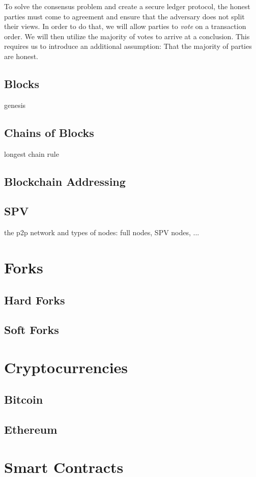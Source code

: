 To solve the consensus problem and create a secure ledger protocol, the honest
parties must come to agreement and ensure that the adversary does not split
their views. In order to do that, we will allow parties to \emph{vote} on a
transaction order. We will then utilize the majority of votes to arrive at a
conclusion. This requires us to introduce an additional assumption: That the
majority of parties are honest.



\subsection{Blocks}
genesis
\subsection{Chains of Blocks}
longest chain rule
\subsection{Blockchain Addressing}
\subsection{SPV}
the p2p network and types of nodes: full nodes, SPV nodes, ...

\section{Forks}
\subsection{Hard Forks}
\subsection{Soft Forks}

\section{Cryptocurrencies}
\subsection{Bitcoin}
\subsection{Ethereum}

\section{Smart Contracts}
